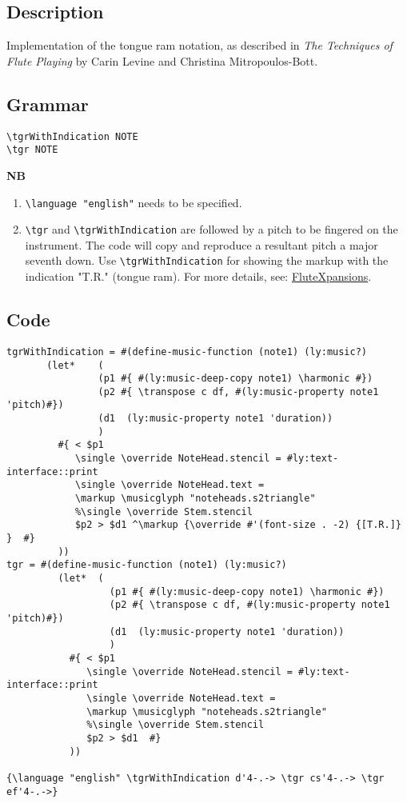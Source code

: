 \documentclass[11pt, oneside]{book}   	%
\begin{document}
\subsection{Description}
Implementation of the tongue ram notation, as described in \textit{The Techniques of Flute Playing} by Carin Levine and Christina Mitropoulos-Bott.\autocite[28]{RN1695} 
\subsection{Grammar}
\begin{verbatim}
\tgrWithIndication NOTE
\tgr NOTE
\end{verbatim}
\textbf{NB} \begin{enumerate}
\item \verb|\language "english"| needs to be specified. 
\item \verb|\tgr| and \verb|\tgrWithIndication| are followed by a pitch to be fingered on the instrument. The code will copy and reproduce a resultant pitch a major seventh down. Use \verb|\tgrWithIndication| for showing the markup with the indication "T.R." (tongue ram). For more details, see: \href{https://www.flutexpansions.com/tongue-ram}{FluteXpansions}.
\end{enumerate}
\subsection{Code}
\begin{verbatim}
tgrWithIndication = #(define-music-function (note1) (ly:music?)
       (let* 	(
                (p1 #{ #(ly:music-deep-copy note1) \harmonic #})
                (p2 #{ \transpose c df, #(ly:music-property note1 'pitch)#})
                (d1  (ly:music-property note1 'duration))
                )
         #{ < $p1
            \single \override NoteHead.stencil = #ly:text-interface::print
            \single \override NoteHead.text =
            \markup \musicglyph "noteheads.s2triangle"
            %\single \override Stem.stencil
            $p2 > $d1 ^\markup {\override #'(font-size . -2) {[T.R.]} }  #}
         ))
tgr = #(define-music-function (note1) (ly:music?)
         (let* 	(
                  (p1 #{ #(ly:music-deep-copy note1) \harmonic #})
                  (p2 #{ \transpose c df, #(ly:music-property note1 'pitch)#})
                  (d1  (ly:music-property note1 'duration))
                  )
           #{ < $p1
              \single \override NoteHead.stencil = #ly:text-interface::print
              \single \override NoteHead.text =
              \markup \musicglyph "noteheads.s2triangle"
              %\single \override Stem.stencil
              $p2 > $d1  #}
           ))

{\language "english" \tgrWithIndication d'4-.-> \tgr cs'4-.-> \tgr ef'4-.->}
\end{verbatim}
\end{document}
